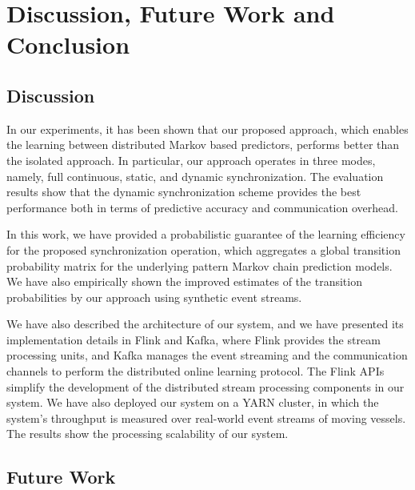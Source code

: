 
\chapter{Discussion, Future Work and Conclusion}
\label{chap:conclusions}


\section{Discussion}

\par In our experiments, it has been shown that our proposed approach, which enables the learning between distributed Markov based predictors, performs better than the isolated approach. In particular, our approach operates in three modes, namely, full continuous, static, and dynamic synchronization. The evaluation results show that the dynamic synchronization scheme provides the best performance both in terms of predictive accuracy and communication overhead.


\par In this work, we have provided a probabilistic guarantee of the learning efficiency for the proposed synchronization operation, which aggregates a global transition probability matrix for the underlying pattern Markov chain prediction models. We have also empirically shown the improved estimates of the transition probabilities by our approach using synthetic event streams.  


\par We have also described the architecture of our system, and we have presented its implementation details in Flink and Kafka, where Flink provides the stream processing units, and Kafka manages the event streaming and the communication channels to perform the distributed online learning protocol. The Flink APIs simplify the development of the distributed stream processing components in our system. We have also deployed our system on a YARN cluster, in which the  system's throughput is measured over real-world event streams of moving vessels. The results show the processing scalability of our system.  



\section{Future Work}

